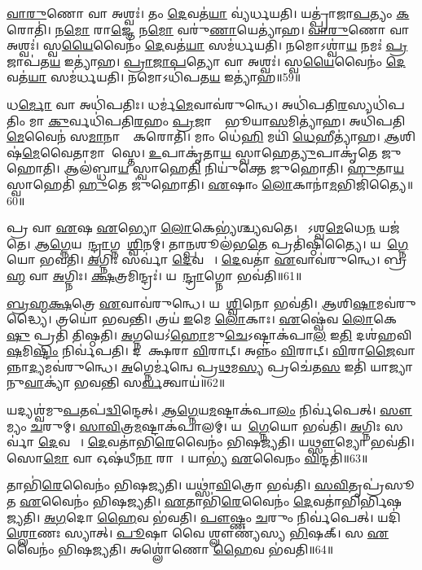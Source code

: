 \ul{𑌵𑌾}\ul{𑌰𑍁}𑌣𑍋 𑌵𑌾 𑌅𑌶𑍍𑌵𑌃॑।
𑌤𑌂 \ul{𑌦𑍇}𑌵𑌤॑\ul{𑌯𑌾} 𑌵𑍍𑌯॑𑌰𑍍𑌧𑌯𑌤𑌿।
𑌯𑌤𑍍𑌪𑍍𑌰𑌾॑𑌜𑌾\ul{𑌪}𑌤𑍍𑌯𑌂 \ul{𑌕}𑌰𑍋𑌤𑌿॑।
𑌨\ul{𑌮𑍋} 𑌰𑌾\ul{𑌜𑍍𑌞𑍇} 𑌨\ul{𑌮𑍋} 𑌵𑌰𑍁॑\ul{𑌣𑌾}𑌯𑍇𑌤𑍍𑌯𑌾॑𑌹।
\ul{𑌵𑌾}\ul{𑌰𑍁}𑌣𑍋 𑌵𑌾 𑌅𑌶𑍍𑌵𑌃॑।
𑌸𑍍𑌵\ul{𑌯𑍈}𑌵𑍈𑌨𑌂॑ \ul{𑌦𑍇}𑌵𑌤॑\ul{𑌯𑌾} 𑌸𑌮॑𑌰𑍍𑌧𑌯𑌤𑌿।
𑌨𑌮𑍋𑌽𑌶𑍍𑌵𑌾॑\ul{𑌯} 𑌨𑌮𑌃॑ \ul{𑌪𑍍𑌰}𑌜𑌾𑌪॑𑌤\ul{𑌯} 𑌇𑌤𑍍𑌯𑌾॑𑌹।
\ul{𑌪𑍍𑌰𑌾}\ul{𑌜𑌾}\ul{𑌪}𑌤𑍍𑌯𑍋 𑌵𑌾 𑌅𑌶𑍍𑌵𑌃॑।
𑌸𑍍𑌵\ul{𑌯𑍈}𑌵𑍈𑌨𑌂॑ \ul{𑌦𑍇}𑌵𑌤॑\ul{𑌯𑌾} 𑌸𑌮॑𑌰𑍍𑌧𑌯𑌤𑌿।
𑌨𑌮𑍋𑌽𑌧𑌿॑𑌪𑌤\ul{𑌯} 𑌇𑌤𑍍𑌯𑌾॑𑌹॥59॥

𑌧\ul{𑌰𑍍𑌮𑍋} 𑌵𑌾 𑌅𑌧𑌿॑𑌪𑌤𑌿𑌃।
𑌧𑌰𑍍𑌮॑\ul{𑌮𑍇}𑌵𑌾𑌵॑𑌰𑍁𑌨𑍍𑌧𑍇।
𑌅𑌧𑌿॑𑌪𑌤𑌿\ul{𑌰}𑌸𑍍𑌯𑌧𑌿॑𑌪𑌤𑌿𑌂 𑌮𑌾 \ul{𑌕𑍁}𑌰𑍍𑌵𑌧𑌿॑𑌪𑌤𑌿\ul{𑌰}𑌹𑌂 \ul{𑌪𑍍𑌰}𑌜𑌾𑌨𑌾𑌂᳚ 𑌭𑍂𑌯𑌾\ul{𑌸}𑌮𑌿𑌤𑍍𑌯𑌾॑𑌹।
𑌅𑌧𑌿॑𑌪𑌤𑌿\ul{𑌮𑍇}𑌵𑍈𑌨॑ 𑌸\ul{𑌮𑌾}𑌨𑌾𑌨𑌾𑌂᳚ 𑌕𑌰𑍋𑌤𑌿।
𑌮𑌾𑌂 𑌧𑍇॑\ul{𑌹𑌿} 𑌮𑌯𑌿॑ \ul{𑌧𑍇}𑌹𑍀𑌤𑍍𑌯𑌾॑𑌹।
\ul{𑌆}𑌶𑌿𑌷॑\-\ul{𑌮𑍇}𑌵𑍈𑌤𑌾𑌮𑌾\-𑌶𑌾᳚𑌸𑍍𑌤𑍇।
\ul{𑌉}𑌪𑌾𑌕𑍃॑𑌤𑌾\ul{𑌯} 𑌸𑍍𑌵𑌾𑌹𑍇\ul{𑌤𑍍𑌯𑍁}𑌪𑌾𑌕𑍃॑𑌤𑍇 𑌜𑍁𑌹𑍋𑌤𑌿।
𑌆𑌲॑𑌬𑍍𑌧𑌾\ul{𑌯} 𑌸𑍍𑌵𑌾𑌹𑍇\ul{𑌤𑌿} 𑌨𑌿𑌯𑍁॑𑌕𑍍𑌤𑍇 𑌜𑍁𑌹𑍋𑌤𑌿।
\ul{𑌹𑍁}𑌤𑌾\ul{𑌯} 𑌸𑍍𑌵𑌾𑌹𑍇𑌤𑌿॑ \ul{𑌹𑍁}𑌤𑍇 𑌜𑍁॑𑌹𑍋𑌤𑌿।
\ul{𑌏}𑌷𑌾𑌂 \ul{𑌲𑍋}𑌕𑌾𑌨𑌾॑\ul{𑌮}𑌭𑌿𑌜𑌿॑𑌤𑍍𑌯𑍈॥60॥

𑌪𑍍𑌰 𑌵𑌾 \ul{𑌏}𑌷 \ul{𑌏}𑌭𑍍𑌯𑍋 \ul{𑌲𑍋}𑌕𑍇𑌭𑍍𑌯॑𑌶𑍍𑌚𑍍𑌯𑌵𑌤𑍇।
𑌯𑍋᳚𑌽𑌶𑍍𑌵\ul{𑌮𑍇}𑌧𑍇\ul{𑌨} 𑌯𑌜॑𑌤𑍇।
\ul{𑌆}\ul{𑌗𑍍𑌨𑍇}𑌯𑌮𑍈᳚\ul{𑌨𑍍𑌦𑍍𑌰𑌾}𑌗𑍍𑌨𑌮𑌾᳚\ul{𑌶𑍍𑌵𑌿}𑌨𑌮𑍍।
𑌤𑌾\ul{𑌨𑍍𑌪}𑌶𑍂𑌲॑𑌭\ul{𑌤𑍇} 𑌪𑍍𑌰𑌤𑌿॑\-𑌷𑍍𑌠𑌿𑌤𑍍𑌯𑍈।
𑌯𑌦𑌾᳚\ul{𑌗𑍍𑌨𑍇}𑌯𑍋 𑌭𑌵॑𑌤𑌿।
\ul{𑌅}𑌗𑍍𑌨𑌿𑌃 𑌸𑌰𑍍𑌵𑌾॑ \ul{𑌦𑍇}𑌵𑌤𑌾𑌃᳚।
\ul{𑌦𑍇}𑌵𑌤𑌾॑ \ul{𑌏}𑌵𑌾𑌵॑𑌰𑍁𑌨𑍍𑌧𑍇।
𑌬𑍍𑌰\ul{𑌹𑍍𑌮} 𑌵𑌾 \ul{𑌅}𑌗𑍍𑌨𑌿𑌃।
\ul{𑌕𑍍𑌷}𑌤𑍍𑌰𑌮𑌿𑌨𑍍𑌦𑍍𑌰𑌃॑।
𑌯𑌦𑍈᳚\ul{𑌨𑍍𑌦𑍍𑌰𑌾}𑌗𑍍𑌨𑍋 𑌭𑌵॑𑌤𑌿॥61॥

\ul{𑌬𑍍𑌰}\ul{𑌹𑍍𑌮}\ul{𑌕𑍍𑌷}𑌤𑍍𑌰𑍇 \ul{𑌏}𑌵𑌾𑌵॑𑌰𑍁𑌨𑍍𑌧𑍇।
𑌯𑌦𑌾᳚\ul{𑌶𑍍𑌵𑌿}𑌨𑍋 𑌭𑌵॑𑌤𑌿।
\ul{𑌆}𑌶𑌿\ul{𑌷𑌾}𑌮𑌵॑𑌰𑍁𑌦𑍍𑌧𑍍𑌯𑍈।
𑌤𑍍𑌰𑌯𑍋॑ 𑌭𑌵𑌨𑍍𑌤𑌿।
𑌤𑍍𑌰𑌯॑ \ul{𑌇}𑌮𑍇 \ul{𑌲𑍋}𑌕𑌾𑌃।
\ul{𑌏}𑌷𑍍𑌵𑍇॑𑌵 \ul{𑌲𑍋}𑌕𑍇\ul{𑌷𑍁} 𑌪𑍍𑌰𑌤𑌿॑ 𑌤𑌿𑌷𑍍𑌠𑌤𑌿।
\ul{𑌅}𑌗𑍍𑌨𑌯𑍇\-𑌽॑\ul{𑌹𑍋}𑌮𑍁\ul{𑌚𑍇}\-𑌽𑌷𑍍𑌟𑌾𑌕॑𑌪𑌾\ul{𑌲} 𑌇\ul{𑌤𑌿} 𑌦𑌶॑𑌹𑌵𑌿\ul{𑌷}𑌮𑌿\ul{𑌷𑍍𑌟𑌿𑌂} 𑌨𑌿𑌰𑍍𑌵॑𑌪𑌤𑌿।
𑌦𑌶𑌾᳚𑌕𑍍𑌷𑌰𑌾 \ul{𑌵𑌿}𑌰𑌾𑌟𑍍।
𑌅𑌨𑍍𑌨𑌂॑ \ul{𑌵𑌿}𑌰𑌾𑌟𑍍।
\ul{𑌵𑌿}𑌰𑌾\ul{𑌜𑍈}𑌵𑌾𑌨𑍍𑌨𑌾\ul{𑌦𑍍𑌯}𑌮𑌵॑𑌰𑍁𑌨𑍍𑌧𑍇।
\ul{𑌅}𑌗𑍍𑌨𑍇𑌰𑍍𑌮॑𑌨𑍍𑌵𑍇 𑌪𑍍𑌰\ul{𑌥}𑌮\ul{𑌸𑍍𑌯} 𑌪𑍍𑌰𑌚𑍇॑𑌤\ul{𑌸} 𑌇𑌤𑌿॑ 𑌯𑌾𑌜𑍍𑌯𑌾𑌨𑍁\ul{𑌵𑌾}𑌕𑍍𑌯𑌾॑ 𑌭𑌵𑌨𑍍𑌤𑌿 𑌸\ul{𑌰𑍍𑌵}𑌤𑍍𑌵𑌾𑌯॑॥62॥\anuvakamend[𑌅𑌧𑌿॑𑌪𑌤\ul{𑌯} 𑌇𑌤𑍍𑌯𑌾॑\ul{𑌹𑌾}𑌭𑌿॑𑌜𑌿𑌤𑍍𑌯𑌾 𑌐\ul{𑌨𑍍𑌦𑍍𑌰𑌾}𑌗𑍍𑌨𑍋 𑌭𑌵॑𑌤𑌿 𑌰𑍁\ul{𑌨𑍍𑌧} 𑌏𑌕𑌂॑ 𑌚]

𑌯𑌦𑍍𑌯𑌶𑍍𑌵॑𑌮𑍁\ul{𑌪}𑌤𑌪॑\ul{𑌦𑍍𑌵𑌿}𑌨𑍍𑌦𑍇𑌤𑍍।
\ul{𑌆}\ul{𑌗𑍍𑌨𑍇}𑌯\ul{𑌮}𑌷𑍍𑌟𑌾𑌕॑𑌪𑌾\ul{𑌲𑌂} 𑌨𑌿𑌰𑍍𑌵॑𑌪𑍇𑌤𑍍।
\ul{𑌸𑍗}𑌮𑍍𑌯𑌂 \ul{𑌚}𑌰𑍁𑌮𑍍।
\ul{𑌸𑌾}\ul{𑌵𑌿}𑌤𑍍𑌰\ul{𑌮}𑌷𑍍𑌟𑌾𑌕॑𑌪𑌾𑌲𑌮𑍍।
𑌯𑌦𑌾᳚\ul{𑌗𑍍𑌨𑍇}𑌯𑍋 𑌭𑌵॑𑌤𑌿।
\ul{𑌅}𑌗𑍍𑌨𑌿𑌃 𑌸𑌰𑍍𑌵𑌾॑ \ul{𑌦𑍇}𑌵𑌤𑌾𑌃᳚।
\ul{𑌦𑍇}𑌵𑌤𑌾॑𑌭𑌿\ul{𑌰𑍇}𑌵𑍈𑌨𑌂॑ 𑌭𑌿𑌷𑌜𑍍𑌯𑌤𑌿।
𑌯\ul{𑌥𑍍𑌸𑍗}𑌮𑍍𑌯𑍋 𑌭𑌵॑𑌤𑌿।
𑌸𑍋\ul{𑌮𑍋} 𑌵𑌾 𑌓𑌷॑𑌧𑍀\ul{𑌨𑌾}\ul{} 𑌰𑌾𑌜𑌾᳚।
𑌯𑌾𑌭𑍍𑌯॑ \ul{𑌏}𑌵𑍈𑌨𑌂 \ul{𑌵𑌿}𑌨𑍍𑌦𑌤𑌿॑॥63॥

𑌤𑌾𑌭𑌿॑\ul{𑌰𑍇}𑌵𑍈𑌨𑌂॑ 𑌭𑌿𑌷𑌜𑍍𑌯𑌤𑌿।
𑌯𑌥𑍍𑌸𑌾॑\ul{𑌵𑌿}𑌤𑍍𑌰𑍋 𑌭𑌵॑𑌤𑌿।
\ul{𑌸}\ul{𑌵𑌿}𑌤𑍃𑌪𑍍𑌰॑𑌸𑍂𑌤 \ul{𑌏}𑌵𑍈𑌨𑌂॑ 𑌭𑌿𑌷𑌜𑍍𑌯𑌤𑌿।
\ul{𑌏}𑌤𑌾𑌭𑌿॑\ul{𑌰𑍇}𑌵𑍈𑌨𑌂॑ \ul{𑌦𑍇}𑌵𑌤𑌾॑𑌭𑌿𑌰𑍍𑌭𑌿𑌷𑌜𑍍𑌯𑌤𑌿।
\ul{𑌅}\ul{𑌗}𑌦𑍋 \ul{𑌹𑍈}𑌵 𑌭॑𑌵𑌤𑌿।
\ul{𑌪𑍗}𑌷𑍍𑌣𑌂 \ul{𑌚}𑌰𑍁𑌂 𑌨𑌿𑌰𑍍𑌵॑𑌪𑍇𑌤𑍍।
𑌯𑌦𑌿॑ \ul{𑌶𑍍𑌲𑍋}𑌣𑌃 𑌸𑍍𑌯𑌾𑌤𑍍।
\ul{𑌪𑍂}𑌷𑌾 𑌵𑍈 𑌶𑍍𑌲𑍗𑌣𑍍𑌯॑𑌸𑍍𑌯 \ul{𑌭𑌿}𑌷𑌕𑍍।
𑌸 \ul{𑌏}𑌵𑍈𑌨𑌂॑ 𑌭𑌿𑌷𑌜𑍍𑌯𑌤𑌿।
𑌅𑌶𑍍𑌲𑍋॑𑌣𑍋 \ul{𑌹𑍈}𑌵 𑌭॑𑌵𑌤𑌿॥64॥

